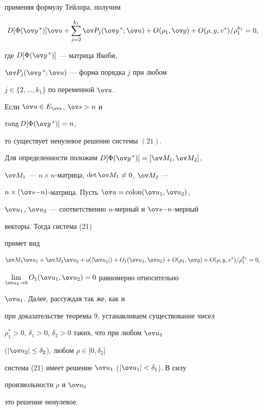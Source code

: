 применяя формулу Тейлора, получим 


\begin{equation} 


D[\Phi(\ov y^{\,*})]\ov u+\sum^{k_1}_{j=2}\ov P_j 


(\ov y^{\,*};\ov u)+O(\rho_1,\ov y)+O(\rho,y,v^*)/ 


\rho^{k_1}_1=0, 


\end{equation} 


где $D[\Phi(\ov y^{\,*})]$ --- матрица Якоби, 


$\ov P_j(\ov y^{\,*};\ov u)$ --- форма порядка $j$ при любом 


$j\in\{2,\dotsc,k_1\}$ по переменной $\ov u$. 


 


\begin{thm} 


Если $\ov u\in E_{\ov s}$, $\ov s>n$ и 


$\rang D[\Phi(\ov y^{\,*})]=n$, 


то существует ненулевое решение системы $(21)$. 


\end{thm} 


 


\begin{pf} 


Для определенности положим $D[\Phi(\ov y^{\,*})]=[\ov M_1,\ov M_2]$, 


$\ov M_1$ --- $n\times n$-матрица, $\det\ov M_1\ne0$, $\ov M_2$ --- 


$n\times (\ov s{-}n)$-матрица. Пусть $\ov u=\Colon(\ov u_1,\ov u_2)$, 


$\ov u_1$, $\ov u_2$ --- соответственно $n$-мерный и $\ov s{-}n$-мерный 


векторы. Тогда система (21)


примет вид 


$$ 


\ov M_1\ov u_1+\ov M_2\ov u_2+o(|\ov u_1|)+ 


O_1(\ov u_1,\ov u_2)+O(\rho_1,\ov y)+ 


O(\rho,y,v^*)/\rho^{k_1}_1=0, 


$$ 


$\lim\limits_{\ov u_2\to0}O_1(\ov u_1,\ov u_2)=0$ равномерно относительно


$\ov u_1$. Далее, рассуждая так же, как и 


при доказательстве теоремы 9, устанавливаем существование чисел 


$\rho^*_1>0$, $\delta_1>0$, $\delta_2>0$ таких, что при любом $\ov u_2$ 


($|\ov u_2|\le\delta_2$), любом $\rho\in]0,\delta_2]$ 


система (21) имеет решение $\ov u_1$ ($|\ov u_1|<\delta_1$). В силу 


произвольности $\rho$ и $\ov u_2$ 


это решение ненулевое. 


\end{pf} 


